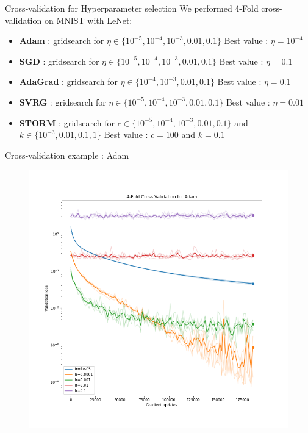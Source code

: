 \documentclass[10pt]{beamer}
\begin{document}
\begin{frame}{Cross-validation for Hyperparameter selection}
    We performed 4-Fold cross-validation on MNIST with LeNet:
    \begin{itemize}
        \item \textbf{Adam} : gridsearch for $\eta \in \{10^{-5}, 10^{-4}, 10^{-3}, 0.01, 0.1\}$ \newline
        Best value : $\eta = 10^{-4}$
        \item \textbf{SGD} : gridsearch for $\eta \in \{10^{-5}, 10^{-4}, 10^{-3}, 0.01, 0.1\}$ \newline
        Best value : $\eta = 0.1$
        \item \textbf{AdaGrad} : gridsearch for $\eta \in \{10^{-4}, 10^{-3}, 0.01, 0.1\}$ \newline
        Best value : $\eta = 0.1$
        \item \textbf{SVRG} : gridsearch for $\eta \in \{10^{-5}, 10^{-4}, 10^{-3}, 0.01, 0.1\}$ \newline
        Best value : $\eta = 0.01$
        \item \textbf{STORM} : gridsearch for $c \in \{10^{-5}, 10^{-4}, 10^{-3}, 0.01, 0.1\}$ and $k \in \{10^{-3}, 0.01, 0.1, 1\}$\newline
        Best value : $c = 100$ and $k=0.1$
        
    \end{itemize}
\end{frame}

\begin{frame}{Cross-validation example : Adam}
    \begin{figure}
        \centering
    \includegraphics[scale=0.35]{midterm presentation/images/adamCV.png}
        \label{fig:adamCV}
    \end{figure}   
\end{frame}
\end{document}
